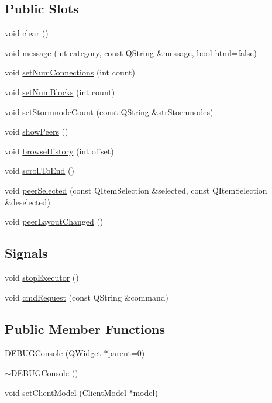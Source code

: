 \subsection*{Public Slots}
\begin{DoxyCompactItemize}
\item 
void \hyperlink{class_d_e_b_u_g_console_abb808be34c4456a00167b042b83942a8}{clear} ()
\item 
void \hyperlink{class_d_e_b_u_g_console_ab3618921bb3e106bc6fb6dca66ab99d5}{message} (int category, const Q\+String \&message, bool html=false)
\item 
void \hyperlink{class_d_e_b_u_g_console_a4ad284e41ed7126ec937e125fbc33c0c}{set\+Num\+Connections} (int count)
\item 
void \hyperlink{class_d_e_b_u_g_console_aaa7bf88f6b7ba3dd12a365f25e03ae37}{set\+Num\+Blocks} (int count)
\item 
void \hyperlink{class_d_e_b_u_g_console_a5ce0bcc35694a0fc561fe898f9861ebb}{set\+Stormnode\+Count} (const Q\+String \&str\+Stormnodes)
\item 
void \hyperlink{class_d_e_b_u_g_console_a7ddf9536bcd2712f15db1dd4887711ba}{show\+Peers} ()
\item 
void \hyperlink{class_d_e_b_u_g_console_a50c3edce372c2cbf1e87351cf95d8b6b}{browse\+History} (int offset)
\item 
void \hyperlink{class_d_e_b_u_g_console_a162e2f582d283a9607d7a0e37aaa10ef}{scroll\+To\+End} ()
\item 
void \hyperlink{class_d_e_b_u_g_console_a712063306f8f788e63ce1a04f0074de9}{peer\+Selected} (const Q\+Item\+Selection \&selected, const Q\+Item\+Selection \&deselected)
\item 
void \hyperlink{class_d_e_b_u_g_console_a3773070395288d2b842aedfafd6aa4d3}{peer\+Layout\+Changed} ()
\end{DoxyCompactItemize}
\subsection*{Signals}
\begin{DoxyCompactItemize}
\item 
void \hyperlink{class_d_e_b_u_g_console_a53c629ecad9e293deb89f7a66610ec05}{stop\+Executor} ()
\item 
void \hyperlink{class_d_e_b_u_g_console_a9281a77cc73387625c0802ef9d1445a7}{cmd\+Request} (const Q\+String \&command)
\end{DoxyCompactItemize}
\subsection*{Public Member Functions}
\begin{DoxyCompactItemize}
\item 
\hyperlink{class_d_e_b_u_g_console_ab42a3a7da3a7c14c1b59fef0e8f6b78c}{D\+E\+B\+U\+G\+Console} (Q\+Widget $\ast$parent=0)
\item 
\hyperlink{class_d_e_b_u_g_console_a0344758d17872e6eb2ee012a6cf14d2b}{$\sim$\+D\+E\+B\+U\+G\+Console} ()
\item 
void \hyperlink{class_d_e_b_u_g_console_a0a9495a191755211c565659db42dc9d1}{set\+Client\+Model} (\hyperlink{class_client_model}{Client\+Model} $\ast$model)
\end{DoxyCompactItemize}
